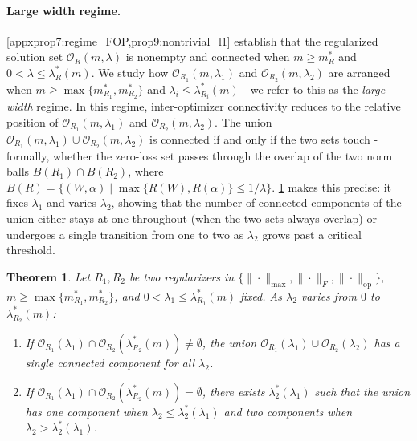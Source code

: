 \documentclass{article}
\newtheorem{theorem}{Theorem}[section]
\newcommand{\op}{\mathrm{op}}
\begin{document}
\paragraph{Large width regime.}
\cref{appxprop7:regime_FOP,prop9:nontrivial_l1} establish that the regularized solution set $\mathcal{O}_R(m,\lambda)$ is nonempty and connected when $m \geq m^*_R$ and $0 < \lambda \leq \lambda^*_R(m)$. We study how $\mathcal{O}_{R_1}(m,\lambda_1)$ and $\mathcal{O}_{R_2}(m,\lambda_2)$ are arranged when $m \geq \max\{m^*_{R_1}, m^*_{R_2}\}$ and $\lambda_i \leq \lambda^*_{R_i}(m)$ - we refer to this as the \emph{large-width} regime. In this regime, inter-optimizer connectivity reduces to the relative position of $\mathcal{O}_{R_1}(m,\lambda_1)$ and $\mathcal{O}_{R_2}(m,\lambda_2)$. The union $\mathcal{O}_{R_1}(m,\lambda_1) \cup \mathcal{O}_{R_2}(m,\lambda_2)$ is connected if and only if the two sets touch - formally, whether the zero-loss set passes through the overlap of the two norm balls $B(R_1) \cap B(R_2)$, where $B(R) = \{(W,\alpha) \mid \max\{R(W), R(\alpha)\} \leq 1/\lambda\}$. \cref{thm:inter-connectivity} makes this precise: it fixes $\lambda_1$ and varies $\lambda_2$, showing that the number of connected components of the union either stays at one throughout (when the two sets always overlap) or undergoes a single transition from one to two as $\lambda_2$ grows past a critical threshold.

\begin{theorem}
\label{thm:inter-connectivity}
Let $R_1, R_2$ be two regularizers in $\{\|\cdot\|_{\max}, \|\cdot\|_F, \|\cdot\|_{\op}\}$, $m \geq \max\{m_{R_1}^*, m_{R_2}^*\}$, and $0 < \lambda_1 \leq \lambda_{R_1}^*(m)$ fixed. As $\lambda_2$ varies from $0$ to $\lambda_{R_2}^{*}(m)$:
\begin{enumerate}[left=0pt]
    \item[i)] If $\mathcal{O}_{R_1}(\lambda_1) \cap \mathcal{O}_{R_2}(\lambda_{R_2}^{*}(m)) \neq \emptyset$, the union $\mathcal{O}_{R_1}(\lambda_1) \cup \mathcal{O}_{R_2}(\lambda_2)$ has a single connected component for all $\lambda_2$.
    \item[ii)] If $\mathcal{O}_{R_1}(\lambda_1) \cap \mathcal{O}_{R_2}(\lambda_{R_2}^{*}(m)) = \emptyset$, there exists $\lambda_2^*(\lambda_1)$ such that the union has one component when $\lambda_2 \leq \lambda_2^*(\lambda_1)$ and two components when $\lambda_2 > \lambda_2^*(\lambda_1)$.
\end{enumerate}
\end{theorem}
\end{document}
